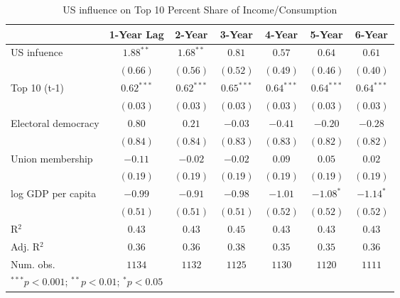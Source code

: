 
\begin{table}
\caption{US influence on Top 10 Percent Share of Income/Consumption}
\begin{center}
\begin{tabular}{l c c c c c c}
\toprule
 & 1-Year Lag & 2-Year & 3-Year & 4-Year & 5-Year & 6-Year \\
\midrule
US infuence         & $\mathbf{1.88}^{**}$  & $\mathbf{1.68}^{**}$  & $0.81$                & $0.57$                & $0.64$                & $0.61$                \\
                    & $(0.66)$              & $(0.56)$              & $(0.52)$              & $(0.49)$              & $(0.46)$              & $(0.40)$              \\
Top 10 (t-1)        & $\mathbf{0.62}^{***}$ & $\mathbf{0.62}^{***}$ & $\mathbf{0.65}^{***}$ & $\mathbf{0.64}^{***}$ & $\mathbf{0.64}^{***}$ & $\mathbf{0.64}^{***}$ \\
                    & $(0.03)$              & $(0.03)$              & $(0.03)$              & $(0.03)$              & $(0.03)$              & $(0.03)$              \\
Electoral democracy & $0.80$                & $0.21$                & $-0.03$               & $-0.41$               & $-0.20$               & $-0.28$               \\
                    & $(0.84)$              & $(0.84)$              & $(0.83)$              & $(0.83)$              & $(0.82)$              & $(0.82)$              \\
Union membership    & $-0.11$               & $-0.02$               & $-0.02$               & $0.09$                & $0.05$                & $0.02$                \\
                    & $(0.19)$              & $(0.19)$              & $(0.19)$              & $(0.19)$              & $(0.19)$              & $(0.19)$              \\
log GDP per capita  & $-0.99$               & $-0.91$               & $-0.98$               & $-1.01$               & $\mathbf{-1.08}^{*}$  & $\mathbf{-1.14}^{*}$  \\
                    & $(0.51)$              & $(0.51)$              & $(0.51)$              & $(0.52)$              & $(0.52)$              & $(0.52)$              \\
\midrule
R$^2$               & $0.43$                & $0.43$                & $0.45$                & $0.43$                & $0.43$                & $0.43$                \\
Adj. R$^2$          & $0.36$                & $0.36$                & $0.38$                & $0.35$                & $0.35$                & $0.36$                \\
Num. obs.           & $1134$                & $1132$                & $1125$                & $1130$                & $1120$                & $1111$                \\
\bottomrule
\multicolumn{7}{l}{\scriptsize{$^{***}p<0.001$; $^{**}p<0.01$; $^{*}p<0.05$}}
\end{tabular}
\label{table:coefficients}
\end{center}
\end{table}
